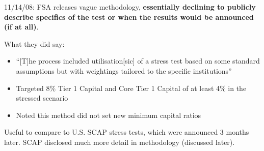 \documentclass[8pt]{beamer}
\begin{document}
{\begin{columns}[T]
\begin{column}{.48\textwidth}
11/14/08: FSA releases vague methodology, \textbf{essentially declining to publicly describe specifics of the test or when the results would be announced (if at all)}. 

\vspace{2mm}

What they did say:

\begin{itemize}
\item ``[T]he process included utilisation[sic] of a stress test based on some standard assumptions but with weightings tailored to the specific institutions'' 
\item Targeted 8\% Tier 1 Capital and Core Tier 1 Capital of at least 4\% in the stressed scenario
\item Noted this method did not set new minimum capital ratios
\end{itemize}

Useful to compare to U.S. SCAP stress tests, which were announced 3 months later. SCAP disclosed much more detail in methodology (discussed later).

\end{column}%
\end{columns}

}
\end{document}
